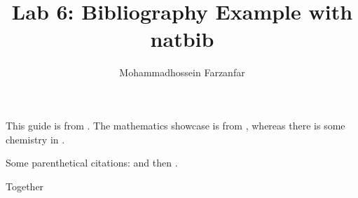 \documentclass{article}
\author{Mohammadhossein Farzanfar}
\title{Lab 6: Bibliography Example with natbib}
\begin{document}
\maketitle
This guide is from \citet{Kulyabov2023}. The mathematics showcase is from \citet{Graham1995}, whereas there is some chemistry in \citet{Thomas2008}.

Some parenthetical citations: \citep{Kulyabov2023} and then \citep[p.~56]{Thomas2008}.

\citep[See][pp.~45--48]{Graham1995}

Together \citep{Kulyabov2023,Graham1995,Thomas2008}



\end{document}
